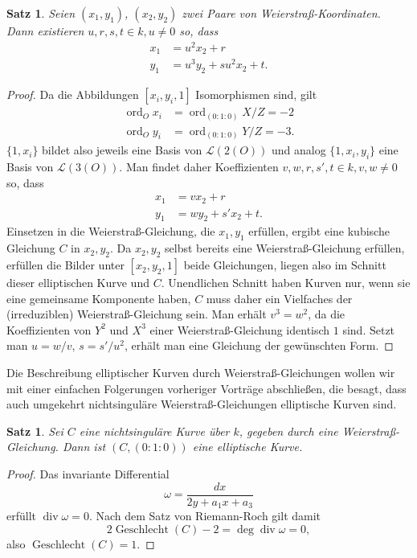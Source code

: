\documentclass{amsart}
\theoremstyle{plain}
\newtheorem{proposition}[subsection]{Satz}
\theoremstyle{definition}
\newcommand{\divop}{\operatorname{div}}
\newcommand{\genus}{\operatorname{Geschlecht}}
\newcommand{\riemannspace}{\mathcal{L}}
\newcommand{\ord}{\operatorname{ord}}
\begin{document}
\begin{proposition}
	Seien $(x_1, y_1)$, $(x_2, y_2)$ zwei Paare von Weierstraß-Koordinaten.
	Dann existieren $u, r, s, t \in k, u \neq 0$ so, dass
	\begin{align*}
		x_1 & = u^2 x_2 + r \\
		y_1 & = u^3 y_2 + s u^2 x_2 + t.
	\end{align*}
\end{proposition}
\begin{proof}
	Da die Abbildungen $[x_i, y_i, 1]$ Isomorphismen sind, gilt
	\begin{align*}
		\ord_O x_i & = \ord_{(0 : 1 : 0)} X/Z = -2\\
		\ord_O y_i & = \ord_{(0 : 1 : 0)} Y/Z = -3.
	\end{align*}
	$\{1, x_i\}$ bildet also jeweils eine Basis von $\riemannspace(2(O))$ und analog $\{1, x_i, y_i\}$ eine Basis von $\riemannspace(3(O))$.
	Man findet daher Koeffizienten $v, w, r, s', t \in k, v, w \neq 0$ so, dass
	\begin{align*}
		x_1 & = v x_2 + r \\
		y_1 & = w y_2 + s' x_2 + t.
	\end{align*}
	Einsetzen in die Weierstraß-Gleichung, die $x_1, y_1$ erfüllen, ergibt eine kubische Gleichung $C$ in $x_2, y_2$.
	Da $x_2, y_2$ selbst bereits eine Weierstraß-Gleichung erfüllen, erfüllen die Bilder unter $[x_2, y_2, 1]$ beide Gleichungen, liegen also im Schnitt dieser elliptischen Kurve und $C$.
	Unendlichen Schnitt haben Kurven nur, wenn sie eine gemeinsame Komponente haben, $C$ muss daher ein Vielfaches der (irreduziblen) Weierstraß-Gleichung sein.
	Man erhält $v^3 = w^2$, da die Koeffizienten von $Y^2$ und $X^3$ einer Weierstraß-Gleichung identisch $1$ sind.
	Setzt man $u = w / v$, $s = s' / u^2$, erhält man eine Gleichung der gewünschten Form. 
\end{proof}

Die Beschreibung elliptischer Kurven durch Weierstraß-Gleichungen wollen wir mit einer einfachen Folgerungen vorheriger Vorträge abschließen, die besagt, dass auch umgekehrt nichtsinguläre Weierstraß-Gleichungen elliptische Kurven sind.
\begin{proposition}
	Sei $C$ eine nichtsinguläre Kurve über $k$, gegeben durch eine Weierstraß-Gleichung.
	Dann ist $(C, (0 : 1 : 0))$ eine elliptische Kurve.
\end{proposition}
\begin{proof}
	Das invariante Differential
	\begin{equation*}
		\omega = \frac{dx}{2y + a_1x + a_3}
	\end{equation*}
	erfüllt $\divop \omega = 0$. Nach dem Satz von Riemann-Roch gilt damit
	\begin{equation*}
		2 \genus(C) - 2 = \deg \divop \omega = 0,
	\end{equation*}
	also $\genus(C) = 1$.
\end{proof}
\end{document}
